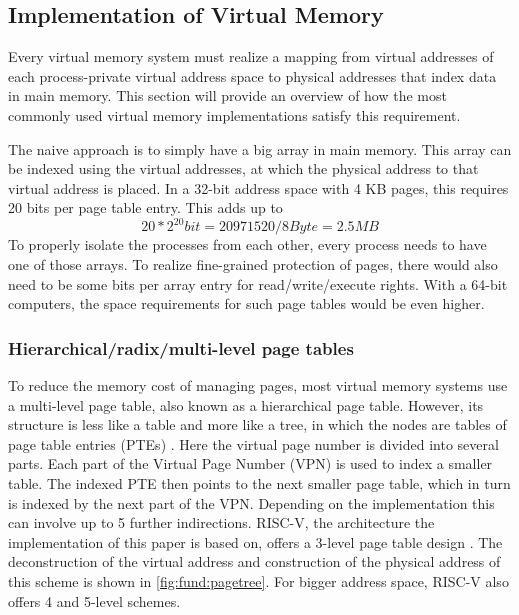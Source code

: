 \subsection{Implementation of Virtual Memory}
Every virtual memory system must realize a mapping from virtual addresses of each process-private virtual address space to physical addresses that index data in main memory.
This section will provide an overview of how the most commonly used virtual memory implementations satisfy
this requirement.


The naive approach is to simply have a big array in main memory. This array can be indexed
using the virtual addresses, at which the physical address to that virtual address is placed.
In a 32-bit address space with 4 KB pages, this requires 20 bits per page table entry. This
adds up to \[ 20 * 2^{20} bit = 20971520 / 8 Byte = 2.5 MB \]
To properly isolate the processes from each other, every process needs to have one of those arrays.
To realize fine-grained protection of pages, there would also need to be some bits per array entry
for read/write/execute rights.
With a 64-bit computers, the space requirements for such page tables would be even higher.

\subsubsection{Hierarchical/radix/multi-level page tables}
To reduce the memory cost of managing pages, most  virtual memory systems use a
multi-level page table, also known as a hierarchical page table. However, its structure
is less like a table and more like a tree, in which the nodes are tables of page table entries (PTEs) \cite{tanenbaumOS}.
Here the virtual page number is divided into several parts. Each part of the Virtual Page Number (VPN)
is used to index a smaller table. The indexed PTE then points to the next smaller page table,
which in turn is indexed by the next part of the VPN. Depending on the implementation
this can involve up to 5 further indirections.
RISC-V, the architecture the implementation of this paper is based on, offers a 3-level page table
design \cite{riscvreader}.
The deconstruction of the virtual address and construction of the physical address of this
scheme is shown in \ref{fig:fund:pagetree}.
For bigger address space, RISC-V also offers 4 and 5-level schemes.

